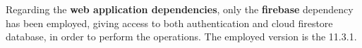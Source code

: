 \noindent Regarding the \textbf{web application dependencies}, only the \textbf{firebase} \cite{Firebase} dependency has been employed, giving access to both authentication and cloud firestore database, in order to perform the operations. The employed version is the 11.3.1.

\newpage